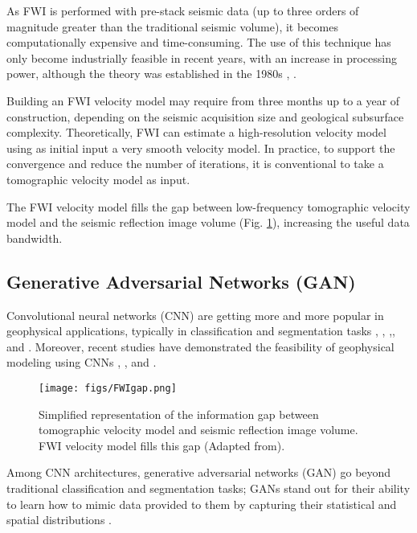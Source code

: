 \documentclass[conference]{IEEEtran}
\begin{document}
As FWI is performed with pre-stack seismic data (up to three orders of magnitude greater than the traditional seismic volume), it becomes computationally expensive and time-consuming.  The use of this technique has only become industrially feasible in recent years, with an increase in processing power, although the theory was established in the 1980s \cite{lailly1983sequence}, \cite{Tarantola1984InversionOS}.

Building an FWI velocity model may require from three months up to a year of construction, depending on the seismic acquisition size and geological subsurface complexity. Theoretically, FWI can estimate a high-resolution velocity model using as initial input a very smooth velocity model. In practice, to support the convergence and reduce the number of iterations, it is conventional to take a tomographic velocity model as input.

The FWI velocity model fills the gap between low-frequency tomographic velocity model and the seismic reflection image volume (Fig. \ref{fig:FWIgap}), increasing the useful data bandwidth. 

\subsection{Generative Adversarial Networks (GAN)}

Convolutional neural networks (CNN) are getting more and more popular in geophysical applications, typically in classification and segmentation tasks \cite{Geng2020AutomatedDO}, \cite{Xiong2018SeismicFD}, \cite{Shi2019SaltSegA3},\cite{Wu2019FaultSeg3DUS}, and \cite{Guazzelli2020Efficient3S}. Moreover, recent studies have demonstrated the feasibility of geophysical modeling using CNNs \cite{Ren2020APN}, \cite{Moseley2020SolvingTW}, and \cite{Zhang2019PhysicsguidedCN}.

\begin{figure}[b]
 \centering
 \texttt{[image: figs/FWIgap.png]}
  \caption{Simplified representation of the information gap between tomographic velocity model and seismic reflection image volume. FWI velocity model fills this gap (Adapted from\cite{Claerbout1985ImagingTE}).}
 \label{fig:FWIgap}
\end{figure}

Among CNN architectures, generative adversarial networks (GAN) go beyond traditional classification and segmentation tasks; GANs stand out for their ability to learn how to mimic data provided to them by capturing their statistical and spatial distributions \cite{Goodfellow2014GenerativeAN}. 
\end{document}
